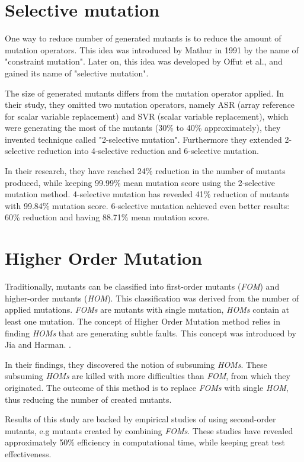 \documentclass[
  digital, %
  table,   %
  lof,     %
  lot,     %
]{fithesis3}
\begin{document}
\section{Selective mutation}
One way to reduce number of generated mutants is to reduce the amount of mutation operators. This idea was introduced by Mathur in 1991 by the name of "constraint mutation".
Later on, this idea was developed by Offut et al., and gained its name of "selective mutation". 
\par The size of generated mutants differs from the mutation operator applied. In their study, they omitted two mutation operators, namely ASR (array reference for scalar variable replacement) and SVR (scalar variable replacement), which were generating the most of the mutants (30\% to 40\% approximately), they invented technique called "2-selective mutation". Furthermore they extended 2-selective reduction into 4-selective reduction and 6-selective mutation. \par In their research, they have reached 24\% reduction in the number of mutants produced, while keeping 99.99\% mean mutation score using the 2-selective mutation method. 4-selective mutation has revealed 41\% reduction of mutants with 99.84\% mutation score. 6-selective mutation  achieved even better results: 60\% reduction and having 88.71\% mean mutation score.
\section{Higher Order Mutation}
Traditionally, mutants can be classified into first-order mutants (\textit{FOM}) and higher-order mutants (\textit{HOM}). This classification was derived from the number of applied mutations. \textit{FOMs} are mutants with single mutation, \textit{HOMs} contain at least one mutation. The concept of Higher Order Mutation method relies in finding \textit{HOMs} that are generating subtle faults. This concept was introduced by Jia and Harman.
. 
\par In their findings, they discovered the notion of subsuming \textit{HOMs}. These subsuming \textit{HOMs} are killed with more difficulties than \textit{FOM}, from which they originated. The outcome of this method is to replace \textit{FOMs} with single \textit{HOM}, thus reducing the number of created mutants.
\par Results of this study are backed by empirical studies of using second-order mutants, e.g mutants created by combining \textit{FOMs}. These studies have revealed approximately 50\% efficiency in computational time, while keeping great test effectiveness.
\end{document}
